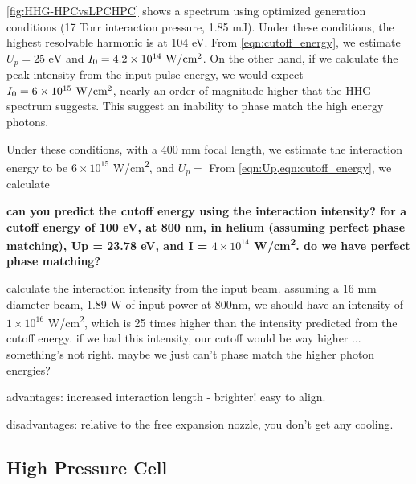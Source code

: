 \cref{fig:HHG-HPCvsLPCHPC} shows a spectrum using optimized generation conditions (17 Torr interaction pressure, 1.85 mJ). Under these conditions, the highest resolvable harmonic is at 104 eV. From \cref{eqn:cutoff_energy}, we estimate $U_p = 25 \textrm{ eV}$ and $I_0 = 4.2 \times 10^{14} \textrm{ W/cm\textsuperscript{2}}$. On the other hand, if we calculate the peak intensity from the input pulse energy, we would expect $I_0 = 6 \times 10^{15} \textrm{ W/cm\textsuperscript{2}}$, nearly an order of magnitude higher that the HHG spectrum suggests. This suggest an inability to phase match the high energy photons.

Under these conditions, with a 400 mm focal length, we estimate the interaction energy to be $6 \times 10^{15}$ W/cm\textsuperscript{2}, and $U_p = $ From \cref{eqn:Up,eqn:cutoff_energy}, we calculate 




\textbf{can you predict the cutoff energy using the interaction intensity? for a cutoff energy of 100 eV, at 800 nm, in helium (assuming perfect phase matching), Up = 23.78 eV, and I = $4 \times 10^{14}$ W/cm\textsuperscript{2}. do we have perfect phase matching?}

calculate the interaction intensity from the input beam. assuming a 16 mm diameter beam, 1.89 W of input power at 800nm, we should have an intensity of $1 \times 10^{16}$ W/cm\textsuperscript{2}, which is 25 times higher than the intensity predicted from the cutoff energy. if we had this intensity, our cutoff would be way higher ... something's not right. maybe we just can't phase match the higher photon energies? 



advantages: increased interaction length - brighter! easy to align.

disadvantages: relative to the free expansion nozzle, you don't get any cooling.

\subsection{High Pressure Cell}
\label{sec:HPC}

